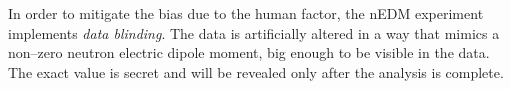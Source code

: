 In order to mitigate the bias due to the human factor, the nEDM experiment implements \emph{data blinding}. The data is artificially altered in a way that mimics a non--zero neutron electric dipole moment, big enough to be visible in the data. The exact value is secret and will be revealed only after the analysis is complete.

















